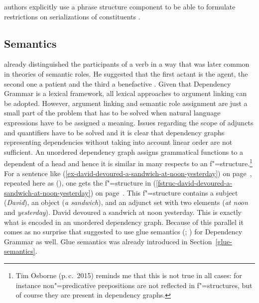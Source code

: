 authors explicitly use a phrase structure component to be able to formulate restrictions on
serializations of constituents \citep{GK2001a,Hellwig2003a}. 



\subsection{Semantics}

\tes already distinguished the participants of a verb in a way that was later common in theories of
semantic roles. He suggested that the first actant is the agent, the second one a patient and the
third a benefactive \citep[Chapter~106]{Tesniere2015a-not-crossreferenced}.
Given that Dependency Grammar is a lexical framework, all
lexical approaches to argument linking can be adopted. However, argument linking and semantic
role assignment are just a small part of the problem that has to be solved when natural language
expressions have to be assigned a meaning. 
Issues regarding the scope of adjuncts and quantifiers
have to be solved and it is clear that dependency graphs representing dependencies without taking
into account linear order are not sufficient. An unordered dependency graph assigns grammatical
functions to a dependent of a head and hence it is similar in many respects to an \lfg
f"=structure.\footnote{%
Tim Osborne (p.\,c.\ 2015) reminds me that this is not true in all cases: for instance non"=predicative prepositions are not reflected in f"=structures, but of course they are present in
dependency graphs.
} For a sentence
like (\ref{ex-david-devoured-a-sandwich-at-noon-yesterday}) on page~\pageref{ex-david-devoured-a-sandwich-at-noon-yesterday}, repeated here as (), one gets
the f"=structure in (\ref{fstruc-david-devoured-a-sandwich-at-noon-yesterday}) on
page~\pageref{fstruc-david-devoured-a-sandwich-at-noon-yesterday}. This f"=structure contains a
subject (\emph{David}), an object (\emph{a sandwich}), and an adjunct set with two elements
(\emph{at noon} and \emph{yesterday}).
\ea
\label{ex-david-devoured-a-sandwich-at-noon-yesterday-two}
David devoured a sandwich at noon yesterday.
\z
This is exactly what is encoded in an unordered dependency graph. Because of this parallel it comes
as no surprise that \citet[]{Broeker2003a-u} suggested to use glue semantics
(\citealp*{DLS93a-u}; \citealp[Chapter~8]{Dalrymple2001a-u}) for Dependency
Grammar as well. Glue semantics was already introduced in Section~\ref{glue-semantics}.

